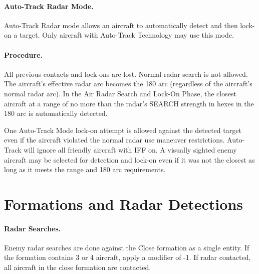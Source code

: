 {\begin{advancedrules}
\paragraph{Auto-Track Radar Mode.}\label{rule:auto-track-mode} Auto-Track Radar mode allows an aircraft to automatically detect and then lock-on a target. Only aircraft with Auto-Track Technology may use this mode. 

\paragraph{Procedure.}  All previous contacts and lock-ons are lost. Normal radar search is not allowed. The aircraft's effective radar arc becomes the 180{\deg} arc (regardless of the aircraft's normal radar arc). In the Air Radar Search and Lock-On Phase, the closest aircraft at a range of no more than the radar's SEARCH strength in hexes in the 180{\deg} arc is automatically detected.

One Auto-Track Mode lock-on attempt is allowed against the detected target even if the aircraft violated the normal radar use maneuver restrictions. Auto-Track will ignore all friendly aircraft with IFF on. A visually sighted enemy aircraft may be selected for detection and lock-on  even if it was not the closest as long as it meets the range and 180{\deg} arc requirements. 


\section{Formations and Radar Detections}

\paragraph{Radar Searches.} Enemy radar searches are done against the Close formation as a single entity. If the formation contains 3 or 4 aircraft, apply a modifier of -1. If radar contacted, all aircraft in the close formation are contacted.


\end{advancedrules}}
